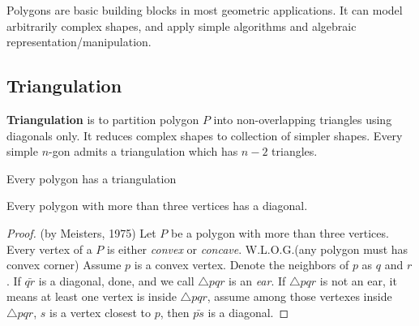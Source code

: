 				Polygons are basic building blocks in most geometric applications. It can model arbitrarily complex shapes, and apply simple algorithms and algebraic representation/manipulation.

			\subsection{Triangulation}
				\begin{definition}[Triangulation]
					\textbf{Triangulation} is to partition polygon $P$ into non-overlapping triangles using diagonals only. It reduces complex shapes to collection of simpler shapes. Every simple $n$-gon admits a triangulation which has $n-2$ triangles.				
				\end{definition}

				\begin{figure}[h!]
					\centering
				\end{figure}

				\begin{theorem}
					Every polygon has a triangulation				
				\end{theorem}

				\begin{lemma}
					Every polygon with more than three vertices has a diagonal.
				\end{lemma}

				\begin{proof}
					(by Meisters, 1975) Let $P$ be a polygon with more than three vertices. Every vertex of a $P$ is either \textit{convex} or \textit{concave}. W.L.O.G.(any polygon must has convex corner) Assume $p$ is a convex vertex. Denote the neighbors of $p$ as $q$ and $r$. If $\bar{qr}$ is a diagonal, done, and we call $\triangle{pqr}$ is an \textit{ear}. If $\triangle{pqr}$ is not an ear, it means at least one vertex is inside $\triangle{pqr}$, assume among those vertexes inside $\triangle{pqr}$, $s$ is a vertex closest to $p$, then $\bar{ps}$ is a diagonal.
				\end{proof}

